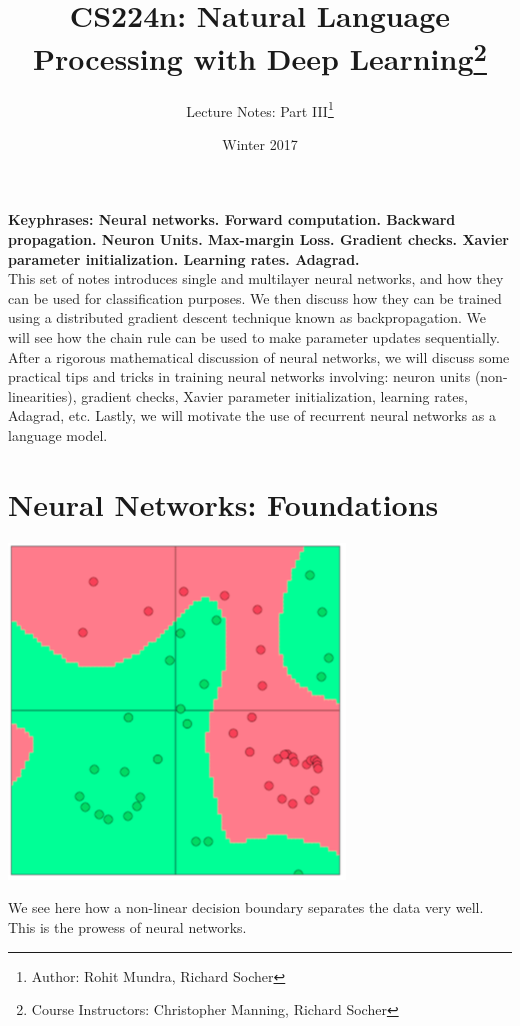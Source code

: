 \documentclass{tufte-handout}
\title{CS224n: Natural Language Processing with Deep Learning\thanks{Course Instructors: Christopher Manning, Richard Socher}}
\author[Rohit Mundra, Richard Socher]{Lecture Notes: Part III\thanks{Author: Rohit Mundra, Richard Socher}}
\date{Winter 2017} %
\begin{document}
\maketitle%



\textbf{Keyphrases: Neural networks. Forward computation. Backward propagation. Neuron Units. Max-margin Loss. Gradient checks. Xavier parameter initialization. Learning rates. Adagrad.}\\

\noindent{}This set of notes introduces single and multilayer neural networks, and how they can be used for classification purposes. We then discuss how they can be trained using a distributed gradient descent technique known as backpropagation. We will see how the chain rule can be used to make parameter updates sequentially. After a rigorous mathematical discussion of neural networks, we will discuss some practical tips and tricks in training neural networks involving: neuron units (non-linearities), gradient checks, Xavier parameter initialization, learning rates, Adagrad, etc. Lastly, we will motivate the use of recurrent neural networks as a language model.

\section{Neural Networks: Foundations}\label{sec:nnets}

\begin{marginfigure}%
  \includegraphics[width=\linewidth]{NonlinearBoundary}
  \caption{We see here how a non-linear decision boundary separates the data very well. This is the prowess of neural networks.}
  \label{fig:NonlinearBoundary}
\end{marginfigure}
\end{document}
